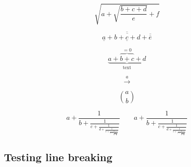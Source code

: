 \begin{dmath*}[compact,spread={1.250000\baselineskip}]
\sqrt{a + \sqrt{\frac{b + c + d}{e}} + f}
\end{dmath*}

\begin{dmath*}[compact,spread={1.250000\baselineskip}]
\overline{\underline{a} + \overline{b + \underline{c} + d} + \overline{\overline{e}}}
\end{dmath*}

\begin{dmath*}[compact,spread={1.250000\baselineskip}]
\underbrace{a + \overbrace{b + c}^{=0} + d}_{\mbox{text}}
\end{dmath*}

\begin{dmath*}[compact,spread={1.250000\baselineskip}]
\stackrel{a}{\longrightarrow}
\end{dmath*}

\begin{dmath*}[compact,spread={1.250000\baselineskip}]
\binom{a }{ b}
\end{dmath*}

\begin{dmath*}[compact,spread={1.250000\baselineskip}]
a + \frac{1}{b + \frac{1}{c + \frac{1}{d + \frac{1}{e + \frac{1}{f + \frac{1}{g + \frac{1}{h}}}}}}} \qquad a + \frac{1}{\displaystyle b + \frac{1}{\displaystyle c + \frac{1}{\displaystyle d + \frac{1}{\displaystyle e + \frac{1}{\displaystyle f + \frac{1}{\displaystyle g + \frac{1}{h}}}}}}}
\end{dmath*}

\subsection{Testing line breaking}


